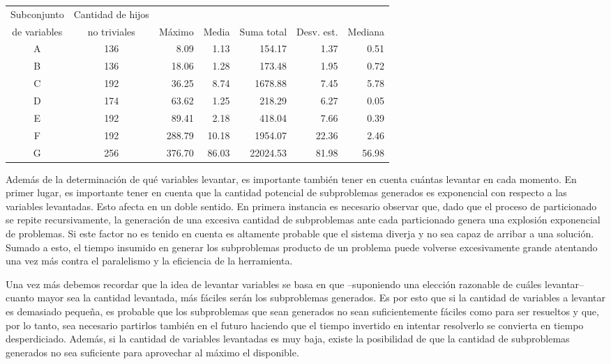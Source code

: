 \begin{tabular}{|c|c|r|r|r|r|r|}
\hline
Subconjunto & Cantidad de hijos & & & & & \\
de variables & no triviales & M\'aximo & Media & Suma total & Desv.
est. & Mediana \\
\hline
A 	& 136 	& 8.09 		& 1.13 		& 154.17	 	& 1.37 		& 0.51 \\
B 	& 136 	& 18.06 		& 1.28 		& 173.48	 	& 1.95 		& 0.72 \\
C 	& 192 	& 36.25 		& 8.74 		& 1678.88 	& 7.45 		& 5.78 \\
D	& 174 	& 63.62 		& 1.25 		& 218.29	 	& 6.27 		& 0.05 \\
E	& 192 	& 89.41 		& 2.18 		& 418.04	 	& 7.66 		& 0.39 \\
F 	& 192 	& 288.79	 	& 10.18 		& 1954.07 	& 22.36 		& 2.46 \\
G 	& 256 	& 376.70	 	& 86.03 		& 22024.53 	& 81.98 		& 56.98 \\
\hline
\end{tabular}

Además de la determinación de qué variables levantar, es importante también
tener en cuenta cuántas levantar en cada momento. En primer lugar, es
importante tener en cuenta que la cantidad potencial de subproblemas generados
es exponencial con respecto a las variables levantadas. Esto afecta en un
doble sentido. En primera instancia es necesario observar que, dado que el
proceso de particionado se repite recursivamente, la generación de una
excesiva cantidad de subproblemas ante cada particionado genera una explosión
exponencial de problemas. Si este factor no es tenido en cuenta es altamente
probable que el sistema diverja y no sea capaz de arribar a una solución.
Sumado a esto, el tiempo insumido en generar los subproblemas producto de un
problema puede volverse excesivamente grande atentando una vez más contra el
paralelismo y la eficiencia de la herramienta.

Una vez más debemos recordar que la idea de levantar variables se basa en que
--suponiendo una elección razonable de cuáles levantar-- cuanto mayor sea la
cantidad levantada, más fáciles serán los subproblemas generados. Es por
esto que si la cantidad de variables a levantar es demasiado pequeña, es
probable que los subproblemas que sean generados no sean suficientemente 
fáciles como para ser resueltos y que, por lo tanto, sea necesario partirlos también en el
futuro haciendo que el tiempo invertido en intentar resolverlo se convierta en
tiempo desperdiciado. Además, si la cantidad de variables levantadas es muy
baja, existe la posibilidad de que la cantidad de subproblemas generados no
sea suficiente para aprovechar al máximo el \hard disponible.

